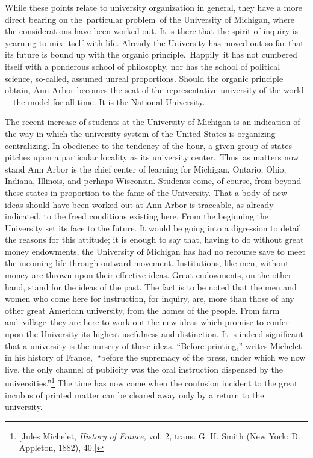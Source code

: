 \documentclass[twoside,symmetric,nobib,justified]{tufte-book}
\begin{document}
While these points relate to university organization in general, they
have a more direct bearing on the~particular problem~of the University
of Michigan, where the considerations have been worked out. It is there
that the spirit of inquiry is yearning to mix itself with life. Already
the University has moved out so far that its future is bound up with the
organic principle.~Happily~it has not cumbered itself with a ponderous
school of philosophy, nor has the school of political science,
so-called, assumed unreal proportions. Should the organic principle
obtain, Ann Arbor becomes the seat of the representative university of
the world---the model for all time. It is the National University.~

The recent increase of students at the University of Michigan is an
indication of the way in which the university system of the United
States is organizing---centralizing. In obedience to the tendency of the
hour, a given group of states pitches upon a particular locality as its
university center.~Thus~as matters now stand Ann Arbor is the chief
center of learning for Michigan, Ontario, Ohio, Indiana, Illinois, and
perhaps Wisconsin. Students come, of course, from beyond these states in
proportion to the fame of the University. That a body of new ideas
should have been worked out at Ann Arbor is traceable, as already
indicated, to the freed conditions existing here. From the beginning the
University set its face to the future. It would be going into a
digression to detail the reasons for this attitude; it is enough to say
that, having to do without great money endowments, the University of
Michigan has had no recourse save to meet the incoming life through
outward movement. Institutions, like men, without money are thrown upon
their effective ideas. Great endowments, on the other hand, stand for
the ideas of the past. The fact is to be noted that the men and women
who come here for instruction, for inquiry, are, more than those of any
other great American university, from the homes of the people. From farm
and~village~they are here to work out the new ideas which promise to
confer upon the University its highest usefulness and distinction. It is
indeed significant that a university is the nursery of these ideas.
``Before printing,'' writes Michelet in his history of France,~``before
the supremacy of the press, under which we now live, the only channel of
publicity was the oral instruction dispensed by the
universities.''\footnote{{[}Jules Michelet, \emph{History of France,}
  vol. 2\emph{,} trans. G. H. Smith \emph{} (New York: D. Appleton,
  1882), 40.{]}} The time has now come when the confusion incident to
the great incubus of printed matter can be cleared away only by a return
to the university.~
\end{document}
